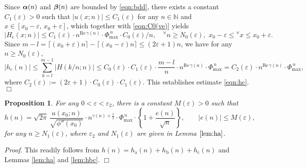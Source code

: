 \documentclass[a4paper,12pt]{article}
\theoremstyle{plain}
\newtheorem{proposition}[theorem]{Proposition}
\def\ra{\mathrm{a}}
\def\rb{\mathrm{b}}
\def\rc{\mathrm{c}}
\def\rRe{\mathrm{Re}}
\def\N{\mathbb{N}}
\def\ve{\varepsilon}
\def\bal{\mbox{\boldmath $\alpha$}}
\def\bbeta{\mbox{\boldmath $\beta$}}
\def\Phim{\Phi_{\scriptstyle \mathrm{max}}}
\begin{document}
Since $\bal(n)$ and $\bbeta(n)$ are bounded by \eqref{eqn:bdd}, 
there exists a constant $C_1(\ve) > 0$ such that $|u(x; n)| \le C_1(\ve)$ for any 
$n \in \N$ and $x \in [x_0-\ve, \, x_0+\ve]$, which together with 
\eqref{eqn:C0(ve)} yields      
\[
|H_{\rc}(x; n)| \le C_1(\ve) \cdot n^{\rRe \, \gamma(n)} \cdot \Phim^{\, n} 
\cdot C_0(\ve)/n,  
\quad {}^{\forall} n \ge N_0(\ve), \,\, x_0-\ve \le {}^{\forall} x \le x_0+\ve.     
\]
Since $m-l = \lceil (x_0 + \ve) n\rceil - \lceil (x_0 - \ve) n\rceil 
\le (2 \ve + 1) n$, we have for any $n \ge N_0(\ve)$,    
\[
| h_{\rc}(n) | \le \sum_{k=l}^{m-1} |H(k/n; n)| \le C_0(\ve) \cdot C_1(\ve) \cdot 
\frac{m-l}{n} \cdot n^{\rRe \, \gamma(n)} \cdot \Phim^{\, n} = 
C_2(\ve) \cdot n^{\rRe \, \gamma(n)} \cdot \Phim^{\, n},  
\]
where $C_2(\ve) := (2 \ve + 1) \cdot C_0(\ve) \cdot C_1(\ve)$. 
This establishes estimate \eqref{eqn:hc}. \hfill $\Box$
\begin{proposition} \label{prop:h(n)} 
For any $0 < \ve < \ve_2$, there is a constant $M(\ve) > 0$ such that 
\begin{equation} \label{eqn:h(n)} 
h(n) = \sqrt{2 \pi} \, \frac{ u(x_0; n) }{\sqrt{ \phi''(x_0)} } \cdot 
n^{\gamma(n) + \frac{1}{2} } \cdot \Phim^{\, n} \cdot 
\left\{ 1 + \frac{e(n)}{ \sqrt{n} } \right \}, 
\qquad |e(n)| \le M(\ve), 
\end{equation}
for any $n \ge N_1(\ve)$, where $\ve_2$ and $N_1(\ve)$ are given in Lemma  
$\ref{lem:ha}$. 
\end{proposition}
{\it Proof}. This readily follows from $h(n) = h_{\ra}(n) + h_{\rb}(n) + h_{\rc}(n)$ and  
Lemmas \ref{lem:ha} and \ref{lem:hbc}. \hfill $\Box$
\end{document}

